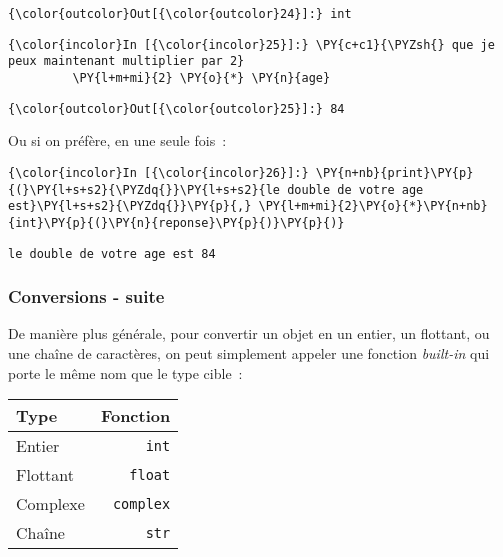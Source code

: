 \begin{Verbatim}[commandchars=\\\{\}]
{\color{outcolor}Out[{\color{outcolor}24}]:} int
\end{Verbatim}
            
    \begin{Verbatim}[commandchars=\\\{\}]
{\color{incolor}In [{\color{incolor}25}]:} \PY{c+c1}{\PYZsh{} que je peux maintenant multiplier par 2}
         \PY{l+m+mi}{2} \PY{o}{*} \PY{n}{age}
\end{Verbatim}


\begin{Verbatim}[commandchars=\\\{\}]
{\color{outcolor}Out[{\color{outcolor}25}]:} 84
\end{Verbatim}
            
    Ou si on préfère, en une seule fois~:

    \begin{Verbatim}[commandchars=\\\{\}]
{\color{incolor}In [{\color{incolor}26}]:} \PY{n+nb}{print}\PY{p}{(}\PY{l+s+s2}{\PYZdq{}}\PY{l+s+s2}{le double de votre age est}\PY{l+s+s2}{\PYZdq{}}\PY{p}{,} \PY{l+m+mi}{2}\PY{o}{*}\PY{n+nb}{int}\PY{p}{(}\PY{n}{reponse}\PY{p}{)}\PY{p}{)}
\end{Verbatim}


    \begin{Verbatim}[commandchars=\\\{\}]
le double de votre age est 84

    \end{Verbatim}

    \hypertarget{conversions---suite}{%
\subsubsection{Conversions - suite}\label{conversions---suite}}

    De manière plus générale, pour convertir un objet en un entier, un
flottant, ou une chaîne de caractères, on peut simplement appeler une
fonction \emph{built-in} qui porte le même nom que le type cible~:

\begin{longtable}[]{@{}lr@{}}
\toprule
Type & Fonction\tabularnewline
\midrule
\endhead
Entier & \texttt{int}\tabularnewline
Flottant & \texttt{float}\tabularnewline
Complexe & \texttt{complex}\tabularnewline
Chaîne & \texttt{str}\tabularnewline
\bottomrule
\end{longtable}

